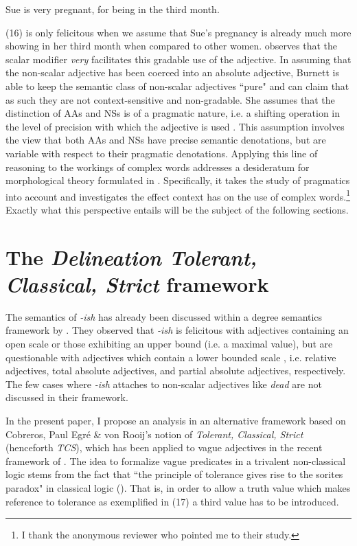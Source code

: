\documentclass[output=paper]{langsci/langscibook}
\begin{document}
\ea
	Sue is very pregnant, for being in the third month.
\z

(16) is only felicitous when we assume that Sue's pregnancy is already much more showing in her third month when compared to other women. \textcite[44]{Burnett2017} observes that the scalar modifier \textit{very} facilitates this gradable use of the adjective. In assuming that the non-scalar adjective has been coerced into an absolute adjective, Burnett is able to keep the semantic class of non-scalar adjectives ``pure" and can claim that as such they are not context-sensitive and non-gradable. She assumes that the distinction of AAs and NSs is of a pragmatic nature, i.e. a shifting operation in the level of precision with which the adjective is used \citeyearpar[95]{Burnett2017}. This assumption involves the view that both AAs and NSs have precise semantic denotations, but are variable with respect to their pragmatic denotations. Applying this line of reasoning to the workings of complex words addresses a desideratum for morphological theory formulated in \textcite[226]{Plagetal}. Specifically, it takes the study of pragmatics into account and investigates the effect context has on the use of complex words.\footnote{I thank the anonymous reviewer who pointed me to their study.} Exactly what this perspective entails will be the subject of the following sections.

\section{The \textit{Delineation Tolerant, Classical, Strict} framework}
\label{sec:deltcs} %

The semantics of \textit{-ish} has already been discussed within a degree semantics framework by \citet*{Bochnak2014}. They observed that \textit{-ish} is felicitous with adjectives containing an open scale or those exhibiting an upper bound (i.e. a maximal value), but are questionable with adjectives which contain a lower bounded scale \citeyearpar[435--436]{Bochnak2014}, i.e. relative adjectives, total absolute adjectives, and partial absolute adjectives, respectively. The few cases where \textit{-ish} attaches to non-scalar adjectives like \textit{dead} are not discussed in their framework.

In the present paper, I propose an analysis in an alternative framework based on Cobreros, Paul Egré \& von Rooij's\citeyearpar{Cobreros2012} notion of \textit{Tolerant, Classical, Strict} (henceforth \textit{TCS}), which has been applied to vague adjectives in the recent framework of \citet{Burnett2017}. The idea to formalize vague predicates in a trivalent non-classical logic stems from the fact that ``the principle of tolerance gives rise to the sorites paradox" in classical logic (\textcite[348]{Cobreros2012}). That is, in order to allow a truth value which makes reference to tolerance as exemplified in (17) a third value has to be introduced. %
\end{document}
